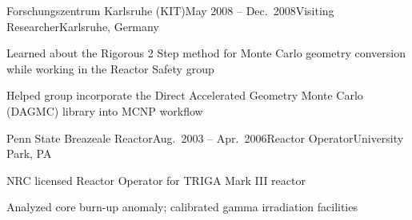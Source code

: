 
\begin{rSubsection}{Forschungszentrum Karlsruhe (KIT)}{May 2008 -- Dec.\ 2008}{Visiting Researcher}{Karlsruhe, Germany}
\item Learned about the Rigorous 2 Step method for Monte Carlo geometry conversion while working in the Reactor Safety group
\item Helped group incorporate the Direct Accelerated Geometry Monte Carlo (DAGMC) library into MCNP workflow
\end{rSubsection}




\begin{rSubsection}{Penn State Breazeale Reactor}{Aug.\ 2003 -- Apr.\ 2006}{Reactor Operator}{University Park, PA}
\item NRC licensed Reactor Operator for TRIGA Mark III reactor
\item Analyzed core burn-up anomaly; calibrated gamma irradiation facilities
\end{rSubsection}
